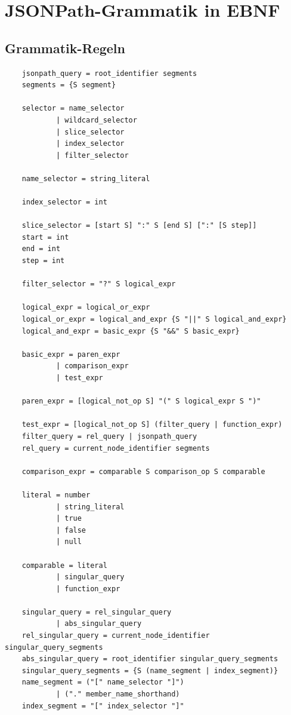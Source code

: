 \documentclass[oneside]{ausarbeitung}
\begin{document}
\appendix

\printbibliography[heading=bibintoc]

\chapter{JSONPath-Grammatik in EBNF}
\label{cha:ebnf}

\section{Grammatik-Regeln}

\begin{lstlisting}
	jsonpath_query = root_identifier segments
	segments = {S segment}
	
	selector = name_selector
			| wildcard_selector 
			| slice_selector 
			| index_selector 
			| filter_selector
	
	name_selector = string_literal
	
	index_selector = int
	
	slice_selector = [start S] ":" S [end S] [":" [S step]]
	start = int
	end = int
	step = int
	
	filter_selector = "?" S logical_expr
	
	logical_expr = logical_or_expr
	logical_or_expr = logical_and_expr {S "||" S logical_and_expr}
	logical_and_expr = basic_expr {S "&&" S basic_expr}
	
	basic_expr = paren_expr
			| comparison_expr
			| test_expr
			
	paren_expr = [logical_not_op S] "(" S logical_expr S ")"
	
	test_expr = [logical_not_op S] (filter_query | function_expr)
	filter_query = rel_query | jsonpath_query
	rel_query = current_node_identifier segments
	
	comparison_expr = comparable S comparison_op S comparable
	
	literal = number
			| string_literal
			| true
			| false
			| null
			
	comparable = literal
			| singular_query
			| function_expr
			
	singular_query = rel_singular_query
			| abs_singular_query
	rel_singular_query = current_node_identifier singular_query_segments
	abs_singular_query = root_identifier singular_query_segments
	singular_query_segments = {S (name_segment | index_segment)}
	name_segment = ("[" name_selector "]")
			| ("." member_name_shorthand)
	index_segment = "[" index_selector "]"
	

\end{lstlisting}
\end{document}
